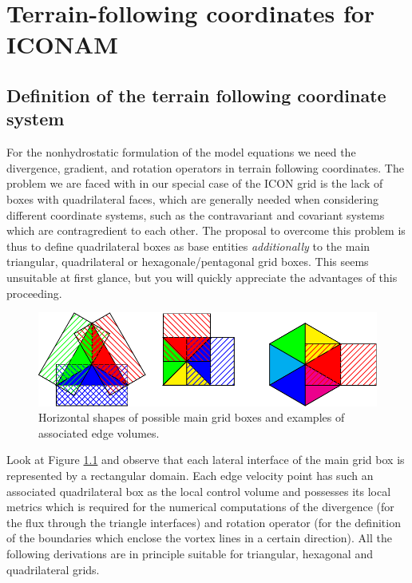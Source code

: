 \chapter{Terrain-following coordinates for ICONAM}

\section{Definition of the terrain following coordinate system}

For the nonhydrostatic formulation of the model equations we need the
divergence, gradient, and rotation operators in terrain following coordinates.
The problem we are faced with in our special case of the ICON grid is the lack
of boxes with quadrilateral faces, which are generally needed when considering
different coordinate systems, such as the contravariant and covariant systems
which are contragredient to each other. The proposal to overcome this problem
is thus to define quadrilateral boxes as base entities {\it additionally} to the
main triangular, quadrilateral or hexagonale/pentagonal grid boxes. This seems
unsuitable at first glance, but you will quickly appreciate the advantages of
this proceeding.

\begin{figure}[h]
%
\begin{center}
\includegraphics{fig_main_boxes.pdf}
\end{center}
\caption{Horizontal shapes of possible main grid boxes and examples of associated edge volumes.}
\label{tri_cont_vol}
\end{figure}

Look at Figure \ref{tri_cont_vol} and observe that each lateral interface
of the main grid box is represented by a rectangular domain. Each edge
velocity point has such an associated quadrilateral box as the local control
volume and possesses its local metrics which is required for the numerical computations
of the divergence (for the flux through the triangle interfaces) and
rotation operator (for the definition of the boundaries which enclose the
vortex lines in a certain direction). All the following derivations are in principle
suitable for triangular, hexagonal and quadrilateral grids.

